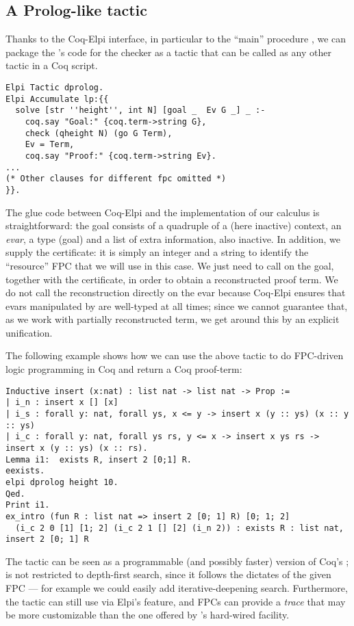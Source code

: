 \subsection{A Prolog-like tactic}

Thanks to the Coq-Elpi interface, in particular to the ``main''
procedure , we can package the \lP's code for the checker
as a tactic that can be called as any other tactic in a Coq script.

\begin{lstlisting}[deletekeywords={goal}]
Elpi Tactic dprolog.
Elpi Accumulate lp:{{
  solve [str ''height'', int N] [goal _  Ev G _] _ :-
    coq.say "Goal:" {coq.term->string G},
    check (qheight N) (go G Term),
    Ev = Term,
    coq.say "Proof:" {coq.term->string Ev}.
...
(* Other clauses for different fpc omitted *)
}}.
\end{lstlisting}

The glue code between Coq-Elpi and the implementation of our calculus
is straightforward: the goal consists of a quadruple of a (here
inactive) context, an \emph{evar}, a type (goal) and a list of extra
information, also inactive. In addition, we supply the certificate: it
is simply an integer and a string to identify the ``resource'' FPC that we
will use in this case. We just need to call  on the goal,
together with the certificate, in order to obtain a reconstructed
proof term. We do not call the reconstruction directly on the evar
because Coq-Elpi ensures that evars manipulated by \lP are well-typed
at all times; since we cannot guarantee that, as we work with
partially reconstructed term, we get around this by an explicit
unification.

The following
example shows how we can use the above tactic to do FPC-driven logic
programming in Coq and return a Coq proof-term:
\begin{lstlisting}
Inductive insert (x:nat) : list nat -> list nat -> Prop :=
| i_n : insert x [] [x]
| i_s : forall y: nat, forall ys, x <= y -> insert x (y :: ys) (x :: y :: ys)
| i_c : forall y: nat, forall ys rs, y <= x -> insert x ys rs -> insert x (y :: ys) (x :: rs).
Lemma i1:  exists R, insert 2 [0;1] R.
eexists.
elpi dprolog height 10.
Qed.
Print i1.
ex_intro (fun R : list nat => insert 2 [0; 1] R) [0; 1; 2]
  (i_c 2 0 [1] [1; 2] (i_c 2 1 [] [2] (i_n 2)) : exists R : list nat, insert 2 [0; 1] R
\end{lstlisting}

The  tactic can be seen as a programmable (and possibly
faster) version of Coq's ; %
  is not restricted to depth-first search, since
it follows the dictates of the given FPC --- for example we could easily add
iterative-deepening search. Furthermore, the tactic can still use
 via Elpi's  feature, and FPCs can provide a
\emph{trace} that may be more customizable than the one offered by 
's hard-wired  facility. 


